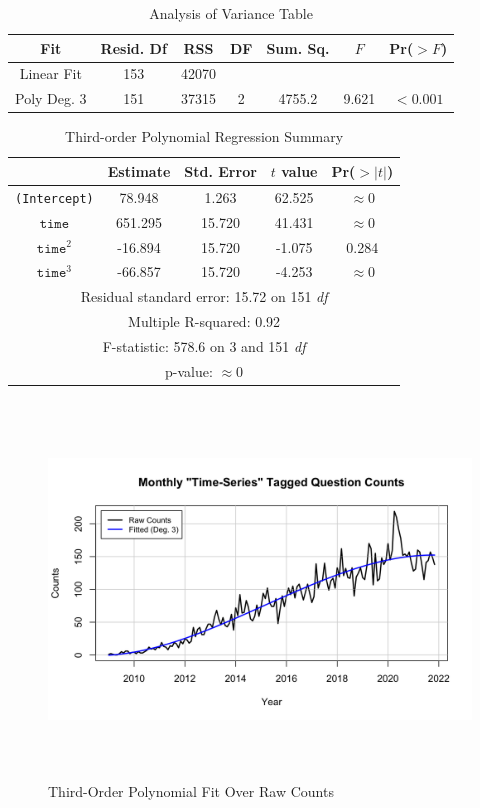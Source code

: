 \documentclass[10pt]{article}
\begin{document}
\begin{table}[h!]
    \centering
    \begin{tabular}{| c | c | c | c | c | c | c | } 
    \hline
    Fit & Resid. Df & RSS & DF & Sum. Sq. & $F$ & Pr($>F$) \\ 
    \hline
    \hline
    Linear Fit & 153 & 42070 & & & & \\
    \hline
    Poly Deg. 3 & 151 & 37315 & 2 & 4755.2 & 9.621  & $< 0.001$\\
    \hline  
    \end{tabular}
    \caption{Analysis of Variance Table}
\end{table}

\begin{table}[h!]
    \centering
    \begin{tabular}{| c | c | c | c | c |} 
    \hline
    & Estimate & Std. Error & $t$ value & Pr($>|t|$) \\ 
    \hline
    \hline
    \texttt{(Intercept)} & 78.948 & 1.263 & 62.525 & $\approx 0$\\
    \hline
    $\texttt{time}$ & 651.295 & 15.720 & 41.431 & $\approx 0$\\
    \hline  
    $\texttt{time}^2$ & -16.894 & 15.720 & -1.075 & 0.284\\
    \hline  
    $\texttt{time}^3$ &  -66.857 & 15.720 & -4.253 & $\approx 0$\\
    \hline 
    \hline
    \multicolumn{5}{|c|}{ Residual standard error: 15.72 on 151 \textit{df}} \\ 
    \multicolumn{5}{|c|}{ Multiple R-squared: 0.92} \\ 
    \multicolumn{5}{|c|}{F-statistic: 578.6 on 3 and 151 \textit{df}} \\ 
    \multicolumn{5}{|c|}{p-value: $\approx 0$} \\ 
    \hline 
    \end{tabular}
    \caption{Third-order Polynomial Regression Summary}
\end{table} 

\begin{figure}[ht!]
    \centering
    \includegraphics[height=100mm, width=125mm]{deg3_fit_raw_counts.png}
    \caption{Third-Order Polynomial Fit Over Raw Counts}
\end{figure}
\end{document}
